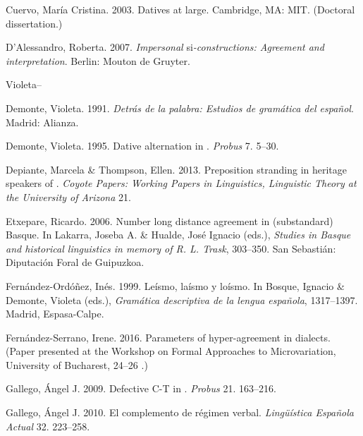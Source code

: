 \documentclass[output=paper]{langsci/langscibook}
\begin{document}
Cuervo, María Cristina. 2003. Datives at large. Cambridge, MA: MIT. (Doctoral dissertation.)

\begin{styleBodyTextIn}
D’Alessandro, Roberta. 2007. \textit{Impersonal} si\textit{{}-constructions: Agreement and interpretation}. Berlin: Mouton de Gruyter.
\end{styleBodyTextIn}

 Violeta–

Demonte, Violeta. 1991. \textit{Detrás de la palabra: Estudios de gramática del español}. Madrid: Alianza.

Demonte, Violeta. 1995. Dative alternation in . \textit{Probus} 7. 5–30.

Depiante, Marcela \& Thompson, Ellen. 2013. Preposition stranding in heritage speakers of . \textit{Coyote Papers: Working Papers in Linguistics, Linguistic Theory at the University of Arizona} 21. 

Etxepare, Ricardo. 2006. Number long distance agreement in (substandard) Basque. In Lakarra, Joseba A. \& Hualde, José Ignacio (eds.), \textit{Studies in Basque and historical linguistics in memory of R. L. Trask}, 303–350. San Sebastián: Diputación Foral de Guipuzkoa.

\begin{styleBodyTextIn}
Fernández-Ordóñez, Inés. 1999. Leísmo, laísmo y loísmo. In Bosque, Ignacio \& Demonte, Violeta (eds.), \textit{Gramática descriptiva de la lengua española}, 1317–1397. Madrid, Espasa-Calpe.
\end{styleBodyTextIn}

Fernández-Serrano, Irene. 2016. Parameters of hyper-agreement in  dialects. (Paper presented at the Workshop on Formal Approaches to  Microvariation, University of Bucharest, 24–26 \citealt{November2016}.)

\begin{styleBodyTextIn}
Gallego, Ángel J. 2009. Defective C-T in . \textit{Probus} 21. 163–216.
\end{styleBodyTextIn}

\begin{styleBodyTextIn}
Gallego, Ángel J. 2010. El complemento de régimen verbal. \textit{Lingüística Española Actual} 32. 223–258. 
\end{styleBodyTextIn}
\end{document}
